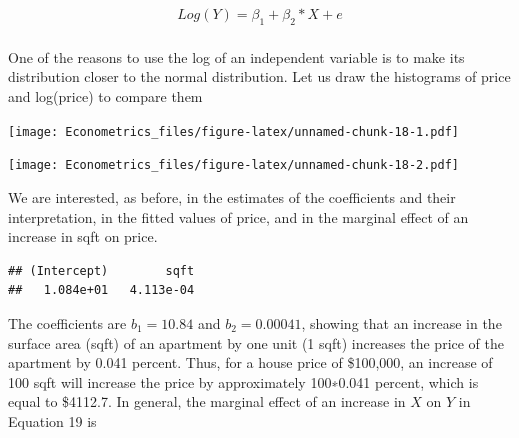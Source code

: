 \documentclass[
]{book}
\newenvironment{Shaded}{\begin{snugshade}}{\end{snugshade}}
\newcommand{\AttributeTok}[1]{\textcolor[rgb]{0.13,0.29,0.53}{#1}}
\newcommand{\FunctionTok}[1]{\textcolor[rgb]{0.13,0.29,0.53}{\textbf{#1}}}
\newcommand{\NormalTok}[1]{#1}
\newcommand{\OtherTok}[1]{\textcolor[rgb]{0.56,0.35,0.01}{#1}}
\newcommand{\SpecialCharTok}[1]{\textcolor[rgb]{0.81,0.36,0.00}{\textbf{#1}}}
\newcommand{\StringTok}[1]{\textcolor[rgb]{0.31,0.60,0.02}{#1}}
\begin{document}
\[
\begin{aligned}
Log(Y)=\beta_1+\beta_2*X+e\\
\end{aligned}
\]

One of the reasons to use the log of an independent variable is to make its distribution closer to the normal distribution. Let us draw the histograms of price and log(price) to compare them

\begin{Shaded}
\end{Shaded}

\texttt{[image: Econometrics\_files/figure-latex/unnamed-chunk-18-1.pdf]}

\begin{Shaded}
\end{Shaded}

\texttt{[image: Econometrics\_files/figure-latex/unnamed-chunk-18-2.pdf]}

We are interested, as before, in the estimates of the coefficients and their interpretation, in the fitted values of price, and in the marginal effect of an increase in sqft on price.

\begin{Shaded}
\end{Shaded}

\begin{verbatim}
## (Intercept)        sqft 
##   1.084e+01   4.113e-04
\end{verbatim}

The coefficients are \(b_1= 10.84\) and \(b_2= 0.00041\), showing that an increase in the surface area (sqft) of an apartment by one unit (1 sqft) increases the price of the apartment by 0.041 percent. Thus, for a house price of \$100,000, an increase of 100 sqft will increase the price by approximately 100∗0.041 percent, which is equal to \$4112.7. In general, the marginal effect of an increase in \(X\) on \(Y\) in Equation 19 is
\end{document}
